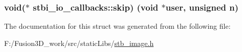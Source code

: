 \subsubsection[{skip}]{\setlength{\rightskip}{0pt plus 5cm}void($\ast$ stbi\+\_\+io\+\_\+callbacks\+::skip) (void $\ast$user, unsigned n)}\label{structstbi__io__callbacks_aedb03a587afc3bffe28979c4e1b981bd}


The documentation for this struct was generated from the following file\+:\begin{DoxyCompactItemize}
\item 
F\+:/\+Fusion3\+D\+\_\+work/src/static\+Libs/\hyperlink{stb__image_8h}{stb\+\_\+image.\+h}\end{DoxyCompactItemize}
